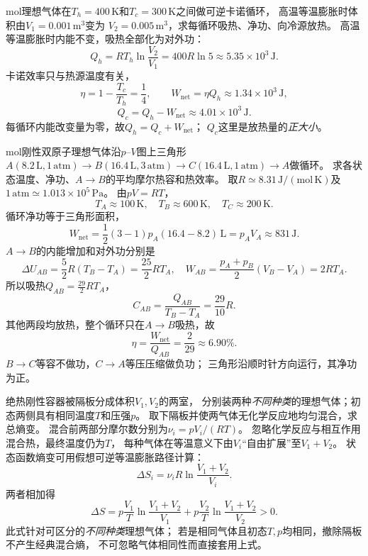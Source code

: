  mol理想气体在$T_h=400\,\mathrm K$和$T_c=300\,\mathrm K$之间做可逆卡诺循环，
高温等温膨胀时体积由$V_1=0.001\,\mathrm{m^3}$变为
$V_2=0.005\,\mathrm{m^3}$，求每循环吸热、净功、向冷源放热。
\workings
高温等温膨胀时内能不变，吸热全部化为对外功：
\[
\boxed{Q_h=RT_h\ln\frac{V_2}{V_1}
=400R\ln5\approx5.35\times10^3\,\mathrm J}.
\]
卡诺效率只与热源温度有关，
\[
\eta=1-\frac{T_c}{T_h}=\frac14,\qquad
\boxed{W_{\mathrm{net}}=\eta Q_h\approx1.34\times10^3\,\mathrm J},
\]
\[
\boxed{Q_c=Q_h-W_{\mathrm{net}}\approx4.01\times10^3\,\mathrm J}.
\]
\crosscheck 每循环内能改变量为零，故$Q_h=Q_c+W_{\mathrm{net}}$；
$Q_c$这里是放热量的\emph{正大小}。

 mol刚性双原子理想气体沿$p$--$V$图上三角形
$A(8.2\,\mathrm L,1\,\mathrm{atm})\to
B(16.4\,\mathrm L,3\,\mathrm{atm})\to
C(16.4\,\mathrm L,1\,\mathrm{atm})\to A$做循环。
求各状态温度、净功、$A\to B$的平均摩尔热容和热效率。
\workings
取$R\simeq8.31\,\mathrm{J/(mol\,K)}$及$1\,\mathrm{atm}\simeq1.013\times10^5\,\mathrm{Pa}$。
由$pV=RT$，
\[
\boxed{T_A\approx100\,\mathrm K},\quad
\boxed{T_B\approx600\,\mathrm K},\quad
\boxed{T_C\approx200\,\mathrm K}.
\]
循环净功等于三角形面积，
\[
\boxed{W_{\mathrm{net}}=\frac12(3-1)p_A(16.4-8.2)\,\mathrm L
=p_AV_A\approx831\,\mathrm J}.
\]
$A\to B$的内能增加和对外功分别是
\[
\Delta U_{AB}=\frac52R(T_B-T_A)=\frac{25}{2}RT_A,\quad
W_{AB}=\frac{p_A+p_B}{2}(V_B-V_A)=2RT_A.
\]
所以吸热$Q_{AB}=\frac{29}{2}RT_A$，
\[
\boxed{C_{AB}=\frac{Q_{AB}}{T_B-T_A}=\frac{29}{10}R}.
\]
其他两段均放热，整个循环只在$A\to B$吸热，故
\[
\boxed{\eta=\frac{W_{\mathrm{net}}}{Q_{AB}}
=\frac{2}{29}\approx6.90\%}.
\]
\crosscheck $B\to C$等容不做功，$C\to A$等压压缩做负功；
三角形沿顺时针方向运行，其净功为正。

\problemtext 绝热刚性容器被隔板分成体积$V_1,V_2$的两室，
分别装两种\emph{不同种类}的理想气体；初态两侧具有相同温度$T$和压强$p$。
取下隔板并使两气体无化学反应地均匀混合，求总熵变。
\workings
混合前两部分摩尔数分别为$\nu_i=pV_i/(RT)$。
忽略化学反应与相互作用混合热，最终温度仍为$T$，
每种气体在等温意义下由$V_i$“自由扩展”至$V_1+V_2$。
状态函数熵变可用假想可逆等温膨胀路径计算：
\[
\Delta S_i=\nu_iR\ln\frac{V_1+V_2}{V_i}.
\]
两者相加得
\[
\boxed{\Delta S=p\frac{V_1}{T}\ln\frac{V_1+V_2}{V_1}
+p\frac{V_2}{T}\ln\frac{V_1+V_2}{V_2}}>0.
\]
\crosscheck 此式针对可区分的\emph{不同种类}理想气体；
若是相同气体且初态$T,p$均相同，撤除隔板不产生经典混合熵，
不可忽略气体相同性而直接套用上式。
